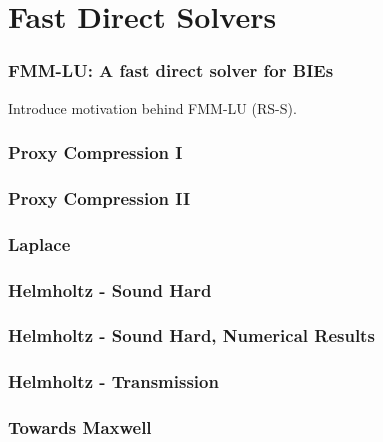 \section{Fast Direct Solvers}

\begin{frame}
    \frametitle{FMM-LU: A fast direct solver for BIEs}
    Introduce motivation behind FMM-LU (RS-S).
\end{frame}


\begin{frame}
    \frametitle{Proxy Compression I}
\end{frame}

\begin{frame}

    \frametitle{Proxy Compression II}

\end{frame}


\begin{frame}

    \frametitle{Laplace}

\end{frame}

\begin{frame}

    \frametitle{Helmholtz - Sound Hard}

\end{frame}


\begin{frame}

    \frametitle{Helmholtz - Sound Hard, Numerical Results}

\end{frame}

\begin{frame}

    \frametitle{Helmholtz - Transmission}

\end{frame}


\begin{frame}

    \frametitle{Towards Maxwell}

\end{frame}